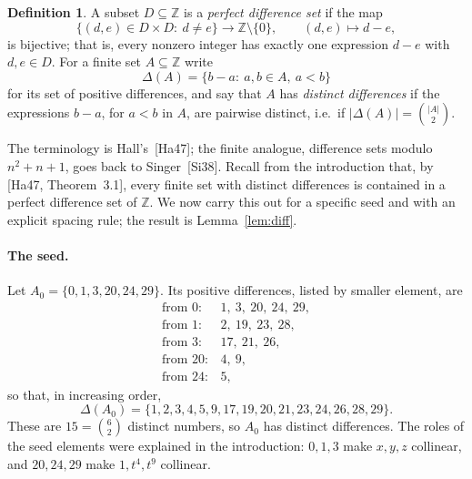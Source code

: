 \documentclass[11pt]{article}
\theoremstyle{plain}
\theoremstyle{definition}
\newtheorem{definition}[theorem]{Definition}
\newcommand{\Z}{\mathbb{Z}}
\begin{document}
\begin{definition}\label{def:pds}
A subset $D\subseteq\Z$ is a \emph{perfect difference set} if the map
\[
 \{(d,e)\in D\times D:\ d\neq e\}\longrightarrow\Z\setminus\{0\},
 \qquad (d,e)\longmapsto d-e,
\]
is bijective; that is, every nonzero integer has exactly one expression
$d-e$ with $d,e\in D$.  For a finite set $A\subseteq\Z$ write
\[
 \Delta(A)=\{b-a:\ a,b\in A,\ a<b\}
\]
for its set of positive differences, and say that $A$ has
\emph{distinct differences} if the expressions $b-a$, for $a<b$ in $A$,
are pairwise distinct, i.e.\ if $|\Delta(A)|=\binom{|A|}{2}$.
\end{definition}

The terminology is Hall's~[Ha47]; the finite analogue, difference sets
modulo $n^2+n+1$, goes back to Singer~[Si38].  Recall from the
introduction that, by [Ha47, Theorem~3.1], every finite set with
distinct differences is contained in a perfect difference set of $\Z$.
We now carry this out for a specific seed and with an explicit spacing
rule; the result is Lemma~\ref{lem:diff}.

\paragraph{The seed.}
Let $A_0=\{0,1,3,20,24,29\}$.  Its positive differences, listed by
smaller element, are
\[
 \begin{array}{ll}
 \text{from }0:& 1,\ 3,\ 20,\ 24,\ 29,\\
 \text{from }1:& 2,\ 19,\ 23,\ 28,\\
 \text{from }3:& 17,\ 21,\ 26,\\
 \text{from }20:& 4,\ 9,\\
 \text{from }24:& 5,
 \end{array}
\]
so that, in increasing order,
\[
 \Delta(A_0)=\{1,2,3,4,5,9,17,19,20,21,23,24,26,28,29\}.
\]
These are $15=\binom62$ distinct numbers, so $A_0$ has distinct
differences.  The roles of the seed elements were explained in the
introduction: $0,1,3$ make $x,y,z$ collinear, and $20,24,29$ make
$1,t^4,t^9$ collinear.
\end{document}
